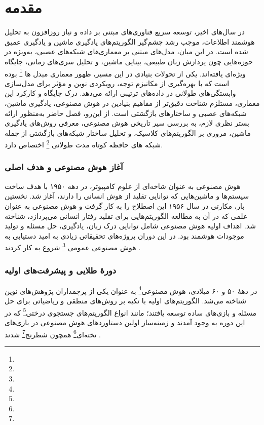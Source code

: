 \chapter{مقدمه}

در سال‌های اخیر، توسعه سریع فناوری‌های مبتنی بر داده و نیاز روزافزون به تحلیل هوشمند اطلاعات، موجب رشد چشم‌گیر الگوریتم‌های یادگیری ماشین و یادگیری عمیق شده است. در این میان، مدل‌های مبتنی بر معماری‌های شبکه‌های عصبی، به‌ویژه در حوزه‌هایی چون پردازش زبان طبیعی، بینایی ماشین، و تحلیل سری‌های زمانی، جایگاه ویژه‌ای یافته‌اند. یکی از تحولات بنیادی در این مسیر، ظهور معماری مبدل ها \footnote{} بوده است که با بهره‌گیری از مکانیزم توجه، رویکردی نوین و مؤثر برای مدل‌سازی وابستگی‌های طولانی در داده‌های ترتیبی ارائه می‌دهد. درک جایگاه و کارکرد این معماری، مستلزم شناخت دقیق‌تر از مفاهیم بنیادین در هوش مصنوعی، یادگیری ماشین، شبکه‌های عصبی و ساختارهای بازگشتی است. از این‌رو، فصل حاضر به‌منظور ارائه بستر نظری لازم، به بررسی سیر تاریخی هوش مصنوعی، معرفی روش‌های یادگیری ماشین، مروری بر الگوریتم‌های کلاسیک، و تحلیل ساختار شبکه‌های بازگشتی از جمله شبکه های حافظه کوتاه مدت طولانی \footnote{} اختصاص دارد.




\subsection{آغاز هوش مصنوعی و هدف اصلی}

هوش مصنوعی به عنوان شاخه‌ای از علوم کامپیوتر، در دهه ۱۹۵۰ با هدف ساخت سیستم‌ها و ماشین‌هایی که توانایی تقلید از هوش انسانی را دارند، آغاز شد. نخستین بار، مکارتی در سال ۱۹۵۶ این اصطلاح را به کار گرفت \cite{mccarthy1956proposal} و هوش مصنوعی به عنوان علمی که در آن به مطالعه الگوریتم‌هایی برای تقلید رفتار انسانی می‌پردازد، شناخته شد. اهداف اولیه هوش مصنوعی شامل توانایی درک زبان، یادگیری، حل مسئله و تولید موجودات هوشمند بود. در این دوران پروژه‌های تحقیقاتی زیادی به امید دستیابی به هوش مصنوعی عمومی \footnote{}
شروع به کار کردند \cite{crevier1993ai,nilsson2010quest}.

\subsection{دورهٔ طلایی و پیشرفت‌های اولیه}

در دههٔ ۵۰ و ۶۰ میلادی، هوش مصنوعی\footnote{} به عنوان یکی از پرچمداران پژوهش‌های نوین شناخته می‌شد. الگوریتم‌های اولیه با تکیه بر روش‌های منطقی و ریاضیاتی برای حل مسئله و بازی‌های ساده توسعه یافتند؛ مانند انواع الگوریتم‌های جستجوی درختی\footnote{} که در این دوره به وجود آمدند و زمینه‌ساز اولین دستاوردهای هوش مصنوعی در بازی‌های تخته‌ای\footnote{} همچون شطرنج\footnote{} شدند \cite{newell1959report}. 


